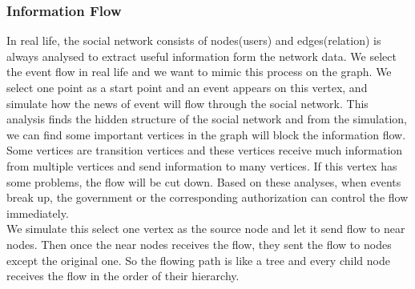 \documentclass{article}
\begin{document}
\subsubsection{Information Flow}
In real life, the social network consists of nodes(users) and edges(relation) is always analysed to extract useful information form the network data. We select the event flow in real life and we want to mimic this process on the graph. We select one point as a start point and an event appears on this vertex, and simulate how the news of event will flow through the social network. This analysis finds the hidden structure of the social network and from the simulation, we can find some important vertices in the graph will block the information flow. Some vertices are transition vertices and these vertices receive much information from multiple vertices and send information to many vertices. If this vertex has some problems, the flow will be cut down. Based on these analyses, when events break up, the government or the corresponding authorization can control the flow immediately.\\
We simulate this select one vertex as the source node and let it send flow to near nodes. Then once the near nodes receives the flow, they sent the flow to nodes except the original one. So the flowing path is like a tree and every child node receives the flow in the order of their hierarchy. \\
\end{document}
